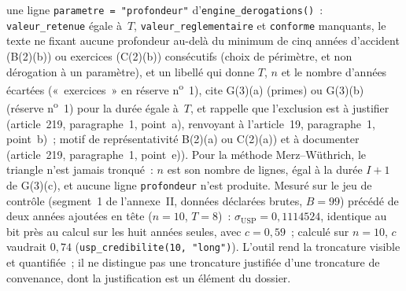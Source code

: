 \documentclass[a4paper,11pt]{article}
\newcommand{\code}[1]{\texttt{\small #1}}
\begin{document}
une ligne \code{parametre = "profondeur"} d'\code{engine\_derogations()}~: \code{valeur\_retenue}
égale à~$T$, \code{valeur\_reglementaire} et \code{conforme} manquants, le texte ne fixant aucune
profondeur au-delà du minimum de cinq années d'accident (B(2)(b)) ou
exercices (C(2)(b)) consécutifs (choix de périmètre, et non dérogation à un paramètre), et un libellé qui donne $T$,
$n$ et le nombre d'années écartées («~exercices~» en réserve n\textsuperscript{o}~1), cite
G(3)(a) (primes) ou G(3)(b) (réserve n\textsuperscript{o}~1) pour la durée égale à~$T$, et
rappelle que l'exclusion est à justifier (article~219, paragraphe~1, point~a), renvoyant à
l'article~19, paragraphe~1, point~b)~; motif de représentativité B(2)(a) ou C(2)(a)) et à
documenter (article~219, paragraphe~1, point~e)). Pour la méthode Merz--Wüthrich, le triangle
n'est jamais tronqué~: $n$ est son nombre de lignes, égal à la durée $I + 1$ de G(3)(c), et
aucune ligne \code{profondeur} n'est produite. Mesuré sur le jeu de contrôle (segment~1 de
l'annexe~II, données déclarées brutes, $B = 99$) précédé de deux années ajoutées en tête ($n =
10$, $T = 8$)~: $\sigma_{\mathrm{USP}} = 0{,}1114524$, identique au bit près au calcul sur les
huit années seules, avec $c = 0{,}59$~; calculé sur $n = 10$, $c$ vaudrait $0{,}74$
(\code{usp\_credibilite(10, "long")}). L'outil rend la troncature visible et quantifiée~; il ne
distingue pas une troncature justifiée d'une troncature de convenance, dont la justification est
un élément du dossier.
\end{document}
